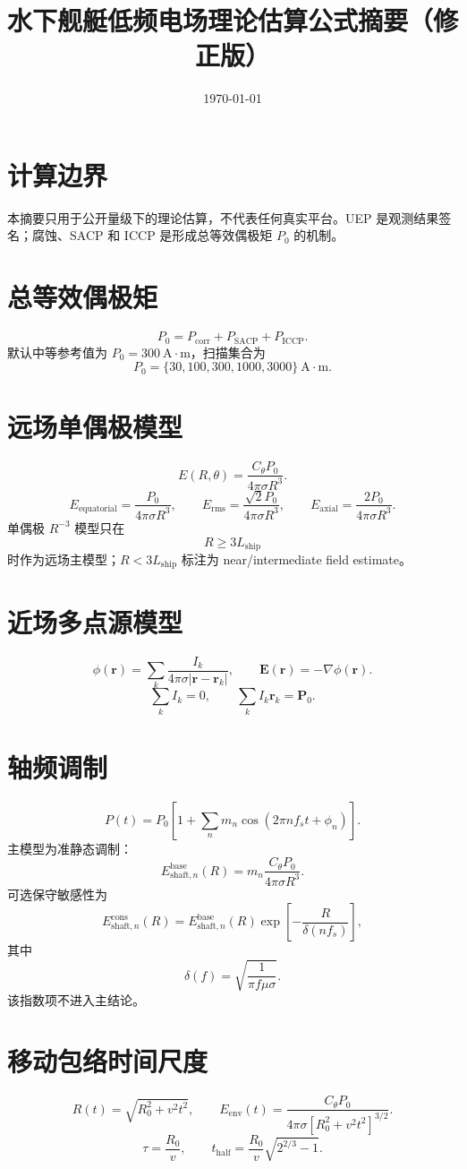 \documentclass[UTF8,a4paper,11pt]{ctexart}
\title{水下舰艇低频电场理论估算公式摘要（修正版）}
\author{}
\date{\today}
\begin{document}
\maketitle

\section*{计算边界}
本摘要只用于公开量级下的理论估算，不代表任何真实平台。UEP 是观测结果签名；腐蚀、SACP 和 ICCP 是形成总等效偶极矩 $P_0$ 的机制。

\section{总等效偶极矩}
\[
P_0=P_{\mathrm{corr}}+P_{\mathrm{SACP}}+P_{\mathrm{ICCP}}.
\]
默认中等参考值为 $P_0=300\ \mathrm{A\cdot m}$，扫描集合为
\[
P_0=\{30,100,300,1000,3000\}\ \mathrm{A\cdot m}.
\]

\section{远场单偶极模型}
\[
E(R,\theta)=\frac{C_\theta P_0}{4\pi\sigma R^3}.
\]
\[
E_{\mathrm{equatorial}}=\frac{P_0}{4\pi\sigma R^3},\qquad
E_{\mathrm{rms}}=\frac{\sqrt{2}P_0}{4\pi\sigma R^3},\qquad
E_{\mathrm{axial}}=\frac{2P_0}{4\pi\sigma R^3}.
\]
单偶极 $R^{-3}$ 模型只在
\[
R\ge 3L_{\mathrm{ship}}
\]
时作为远场主模型；$R<3L_{\mathrm{ship}}$ 标注为 near/intermediate field estimate。

\section{近场多点源模型}
\[
\phi(\bm r)=\sum_k\frac{I_k}{4\pi\sigma|\bm r-\bm r_k|},
\qquad
\bm E(\bm r)=-\nabla\phi(\bm r).
\]
\[
\sum_k I_k=0,\qquad
\sum_k I_k\bm r_k=\bm P_0.
\]

\section{轴频调制}
\[
P(t)=P_0\left[1+\sum_n m_n\cos(2\pi n f_s t+\phi_n)\right].
\]
主模型为准静态调制：
\[
E_{\mathrm{shaft},n}^{\mathrm{base}}(R)
=m_n\frac{C_\theta P_0}{4\pi\sigma R^3}.
\]
可选保守敏感性为
\[
E_{\mathrm{shaft},n}^{\mathrm{cons}}(R)
=E_{\mathrm{shaft},n}^{\mathrm{base}}(R)
\exp\left[-\frac{R}{\delta(nf_s)}\right],
\]
其中
\[
\delta(f)=\sqrt{\frac{1}{\pi f\mu\sigma}}.
\]
该指数项不进入主结论。

\section{移动包络时间尺度}
\[
R(t)=\sqrt{R_0^2+v^2t^2},\qquad
E_{\mathrm{env}}(t)=\frac{C_\theta P_0}{4\pi\sigma [R_0^2+v^2t^2]^{3/2}}.
\]
\[
\tau=\frac{R_0}{v},\qquad
t_{\mathrm{half}}=\frac{R_0}{v}\sqrt{2^{2/3}-1}.
\]
\end{document}
